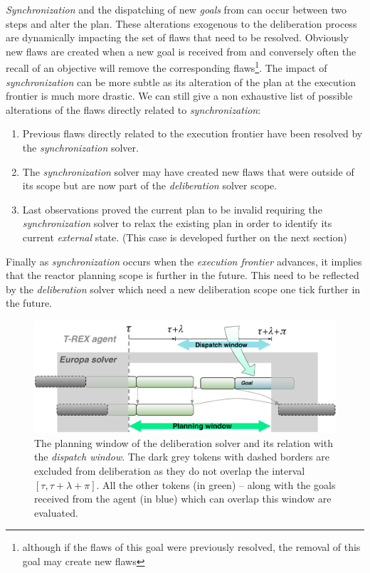 {\em Synchronization} and the dispatching of new {\em goals} from
\rx can occur between two steps and alter the plan. These alterations
exogenous to the deliberation process are dynamically impacting the set
of flaws that need to be resolved. Obviously new flaws are created
when a new goal is received from \rx and conversely often the recall
of an objective will remove the corresponding flaws\footnote{although
  if the flaws of this goal were previously resolved, the removal of
  this goal may create new flaws}. The impact of {\em synchronization}
can be more subtle as its alteration of the plan at the execution
frontier is much more drastic. We can still give a non exhaustive list
of possible alterations of the flaws directly related to {\em
  synchronization}:
\begin{enumerate}
\item Previous flaws directly related to the execution frontier have
  been resolved by the {\em synchronization} solver.
\item The {\em synchronization} solver may have created new flaws that
  were outside of its scope but are now part of the {\em deliberation}
  solver scope.
\item Last observations proved the current plan to be invalid
  requiring the {\em synchronization} solver to relax the existing
  plan in order to identify its current {\em external} state. (This
  case is developed further on the next section)
\end{enumerate}
Finally as {\em synchronization} occurs when the {\em
  execution frontier} advances, it implies that the reactor planning
scope is further in the future. This need to be reflected by the {\em
  deliberation} solver which need a new deliberation scope one tick
further in the future.

\begin{figure}[!htbp]
  \centering
  \includegraphics[width=0.65\columnwidth]{figs/plan_window}
  \caption{\small The planning window of the deliberation solver and its
    relation with the {\em dispatch window}. The dark grey
    tokens   with dashed borders are excluded from deliberation as they do not
    overlap the interval $[\tau, \tau+\lambda+\pi]$. All the other
    tokens (in {\color{green} green}) -- along with the goals received from the
    agent (in {\color{blue} blue}) which can overlap this window are
    evaluated.}
  \label{fig:plan:window}
\end{figure}



